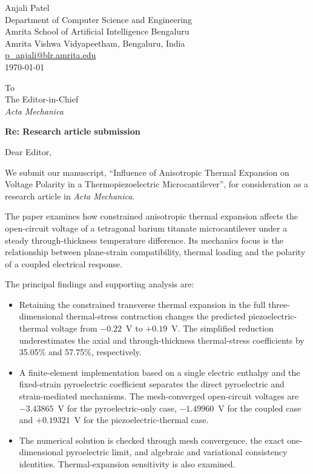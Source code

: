 \documentclass[11pt,a4paper]{article}
\begin{document}
\begin{flushright}
Anjali Patel\\
Department of Computer Science and Engineering\\
Amrita School of Artificial Intelligence Bengaluru\\
Amrita Vishwa Vidyapeetham, Bengaluru, India\\
\href{mailto:p_anjali@blr.amrita.edu}{p\_anjali@blr.amrita.edu}\\[6pt]
\today
\end{flushright}

To\\
The Editor-in-Chief\\
\emph{Acta Mechanica}

\textbf{Re: Research article submission}

Dear Editor,

We submit our manuscript, ``Influence of Anisotropic Thermal Expansion on Voltage Polarity in a Thermopiezoelectric Microcantilever'', for consideration
as a research article in \emph{Acta Mechanica}.

The paper examines how constrained anisotropic thermal expansion affects the
open-circuit voltage of a tetragonal barium titanate microcantilever under a
steady through-thickness temperature difference. Its mechanics focus is the
relationship between plane-strain compatibility, thermal loading and the polarity
of a coupled electrical response.

The principal findings and supporting analysis are:
\begin{itemize}[leftmargin=1.5em,itemsep=2pt,topsep=2pt]
\item Retaining the constrained transverse thermal expansion in the full
three-dimensional thermal-stress contraction changes the predicted
piezoelectric-thermal voltage from $-0.22$~V to $+0.19$~V. The simplified reduction
underestimates the axial and through-thickness thermal-stress coefficients by
35.05\% and 57.75\%, respectively.
\item A finite-element implementation based on a single electric enthalpy and
the fixed-strain pyroelectric coefficient separates the direct pyroelectric and
strain-mediated mechanisms. The mesh-converged open-circuit voltages are
$-3.43865$~V for the pyroelectric-only case, $-1.49960$~V for the coupled case and
$+0.19321$~V for the piezoelectric-thermal case.
\item The numerical solution is checked through mesh convergence, the exact
one-dimensional pyroelectric limit, and algebraic and variational consistency
identities. Thermal-expansion sensitivity is also examined.
\end{itemize}
\end{document}
